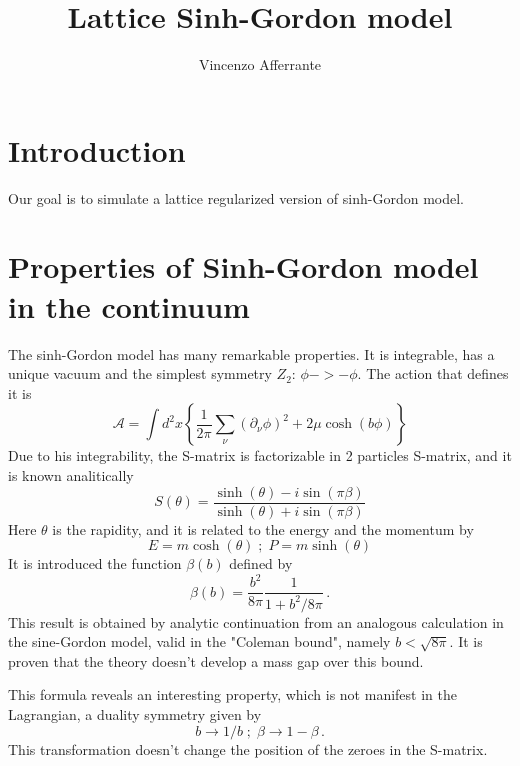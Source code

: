\documentclass[12pt,a4paper]{report}
\begin{document}
 

 
\title{Lattice Sinh-Gordon model }
\author{Vincenzo Afferrante} 
 
\maketitle

\chapter{Introduction} 

Our goal is to simulate  a lattice regularized version of sinh-Gordon model.

\chapter{Properties of Sinh-Gordon model in the continuum }

The sinh-Gordon model has many remarkable properties. It is integrable, has a unique vacuum and the simplest symmetry $Z_2$: $\phi -> -\phi$. The action that defines it is \begin{equation}
\mathcal{A} = \int d^2x \left\lbrace\dfrac{1}{2 \pi} \sum_\nu (\partial_\nu \phi )^2 + 2 \mu \cosh(b \phi) \right\rbrace 
\end{equation} Due to his integrability, the S-matrix is factorizable in 2 particles S-matrix, and it is known analitically \begin{equation}
S(\theta) = \dfrac{\sinh(\theta) -i \sin (\pi \beta)}{\sinh(\theta) +i \sin (\pi \beta) }
\end{equation} Here $\theta$ is the rapidity, and it is related to the energy and the momentum by \begin{equation}
E = m \cosh(\theta) \; ; \; P = m \sinh(\theta)
\end{equation} It is introduced the function $\beta(b)$ defined by \begin{equation}
\beta(b) =  \dfrac{b^2}{8\pi} \dfrac{1}{1+ b^2/8 \pi} \,.
\end{equation} This result is obtained by analytic continuation from an analogous calculation in the sine-Gordon model, valid in the "Coleman bound", namely $b < \sqrt{8\pi}$. It is proven that the theory doesn't develop a mass gap over this bound. 

This formula reveals an interesting property, which is not manifest in the Lagrangian, a duality symmetry given by \begin{equation}
b \to 1/b \; ; \; \beta \to 1- \beta \,.
\end{equation} This transformation doesn't change the position of the zeroes in the S-matrix.
\end{document}
